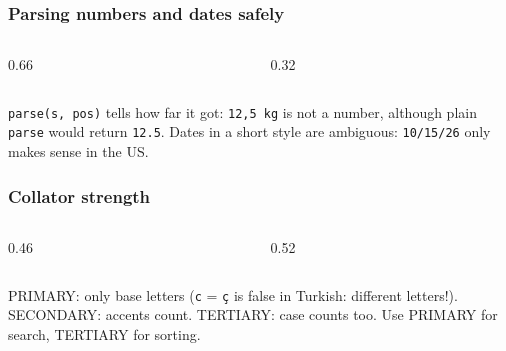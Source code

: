\documentclass[aspectratio=169,10pt,compress]{beamer}
\begin{document}




\begin{frame}[t,fragile] \frametitle{Parsing numbers and dates safely}
  \begin{columns}[T]
    \begin{column}{0.66\textwidth}
    \end{column}
    \begin{column}{0.32\textwidth}
    \end{column}
  \end{columns}

  \vspace{0.1em}
  \small \texttt{parse(s, pos)} tells how far it got: \texttt{12,5 kg} is not a number, although plain \texttt{parse}
  would return \texttt{12.5}. Dates in a short style are ambiguous: \texttt{10/15/26} only makes sense in the US.
\end{frame}





\begin{frame}[t,fragile] \frametitle{Collator strength}
  \begin{columns}[T]
    \begin{column}{0.46\textwidth}
    \end{column}
    \begin{column}{0.52\textwidth}
    \end{column}
  \end{columns}

  \vspace{0.1em}
  \small PRIMARY: only base letters (\texttt{c} = \texttt{ç} is false in Turkish: different letters!).
  SECONDARY: accents count. TERTIARY: case counts too. Use PRIMARY for search, TERTIARY for sorting.
\end{frame}
\end{document}
